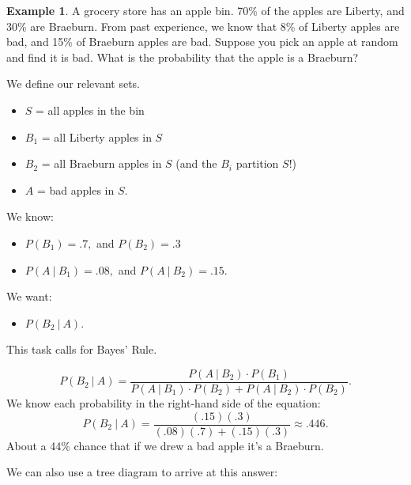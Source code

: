 \documentclass[
]{book}
\providecommand{\tightlist}{%
  \setlength{\itemsep}{0pt}\setlength{\parskip}{0pt}}
\theoremstyle{definition}
\theoremstyle{definition}
\newtheorem{example}{Example}[chapter]
\theoremstyle{definition}
\theoremstyle{definition}
\theoremstyle{remark}
\begin{document}
\begin{example}
\protect\hypertarget{exm:bad-apples}{}\label{exm:bad-apples}A grocery store has an apple bin. 70\% of the apples are Liberty, and 30\% are Braeburn. From past experience, we know that 8\% of Liberty apples are bad, and 15\% of Braeburn apples are bad. Suppose you pick an apple at random and find it is bad. What is the probability that the apple is a Braeburn?

We define our relevant sets.

\begin{itemize}
\tightlist
\item
  \(S\) = all apples in the bin
\item
  \(B_1\) = all Liberty apples in \(S\)
\item
  \(B_2\) = all Braeburn apples in \(S\) (and the \(B_i\) partition \(S\)!)
\item
  \(A\) = bad apples in \(S\).
\end{itemize}

We know:

\begin{itemize}
\tightlist
\item
  \(P(B_1) = .7,\) and \(P(B_2) = .3\)
\item
  \(P(A~|~B_1) = .08,\) and \(P(A~|~B_2) = .15\).
\end{itemize}

We want:

\begin{itemize}
\tightlist
\item
  \(P(B_2 ~|~ A)\).
\end{itemize}

This task calls for Bayes' Rule.

\[P(B_2~|~A) = \frac{P(A~|~B_2)\cdot P(B_1)}{P(A~|~B_1)\cdot P(B_2)+P(A~|~B_2)\cdot P(B_2)}.\]
We know each probability in the right-hand side of the equation:
\[P(B_2~|~A) = \frac{(.15)(.3)}{(.08)(.7)+(.15)(.3)} \approx .446.\]
About a 44\% chance that if we drew a bad apple it's a Braeburn.

We can also use a tree diagram to arrive at this answer:


\end{example}
\end{document}
